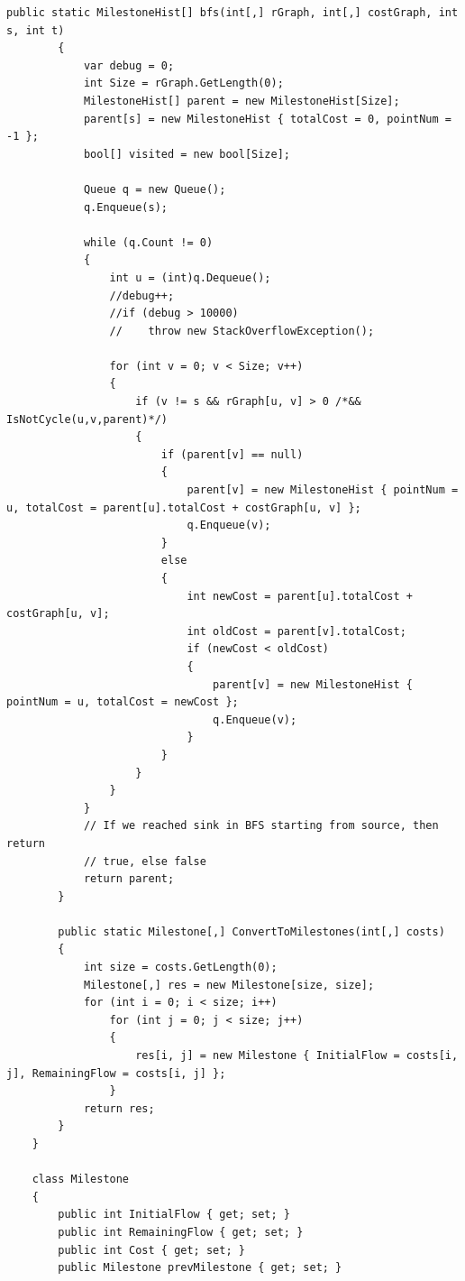 \documentclass[a4paper,14pt,russian,ukrainian,oneside,final]{extreport}
\begin{document}
\begin{lstlisting}[style=csharpinlinestyle]
        public static MilestoneHist[] bfs(int[,] rGraph, int[,] costGraph, int s, int t)
        {
            var debug = 0;
            int Size = rGraph.GetLength(0);
            MilestoneHist[] parent = new MilestoneHist[Size];
            parent[s] = new MilestoneHist { totalCost = 0, pointNum = -1 };
            bool[] visited = new bool[Size];

            Queue q = new Queue();
            q.Enqueue(s);

            while (q.Count != 0)
            {
                int u = (int)q.Dequeue();
                //debug++;
                //if (debug > 10000)
                //    throw new StackOverflowException();

                for (int v = 0; v < Size; v++)
                {
                    if (v != s && rGraph[u, v] > 0 /*&& IsNotCycle(u,v,parent)*/)
                    {
                        if (parent[v] == null)
                        {
                            parent[v] = new MilestoneHist { pointNum = u, totalCost = parent[u].totalCost + costGraph[u, v] };
                            q.Enqueue(v);
                        }
                        else
                        {
                            int newCost = parent[u].totalCost + costGraph[u, v];
                            int oldCost = parent[v].totalCost;
                            if (newCost < oldCost)
                            {
                                parent[v] = new MilestoneHist { pointNum = u, totalCost = newCost };
                                q.Enqueue(v);
                            }
                        }
                    }
                }
            }
            // If we reached sink in BFS starting from source, then return
            // true, else false
            return parent;
        }

        public static Milestone[,] ConvertToMilestones(int[,] costs)
        {
            int size = costs.GetLength(0);
            Milestone[,] res = new Milestone[size, size];
            for (int i = 0; i < size; i++)
                for (int j = 0; j < size; j++)
                {
                    res[i, j] = new Milestone { InitialFlow = costs[i, j], RemainingFlow = costs[i, j] };
                }
            return res;
        }
    }

    class Milestone
    {
        public int InitialFlow { get; set; }
        public int RemainingFlow { get; set; }
        public int Cost { get; set; }
        public Milestone prevMilestone { get; set; }


\end{lstlisting}
\end{document}
